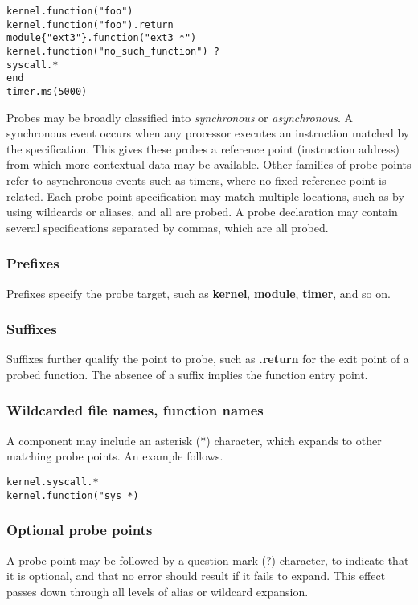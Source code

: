 \documentclass[twoside,english]{article}
\newenvironment{vindent}
{\begin{list}{}{\setlength{\listparindent}{6pt}}
\item[]}
{\end{list}}
\begin{document}
\begin{vindent}
\begin{verbatim}
kernel.function("foo")
kernel.function("foo").return
module{"ext3"}.function("ext3_*")
kernel.function("no_such_function") ?
syscall.*
end
timer.ms(5000)
\end{verbatim}
\end{vindent}

Probes may be broadly classified into \emph{synchronous}
or \emph{asynchronous}. A synchronous event occurs when
any processor executes an instruction matched by the specification. This
gives these probes a reference point (instruction address) from which more
contextual data may be available. Other families of probe points refer to
asynchronous events such as timers, where no fixed reference point is related.
Each probe point specification may match multiple locations, such as by using
wildcards or aliases, and all are probed. A probe declaration may contain
several specifications separated by commas, which are all probed.

\subsubsection{Prefixes}
Prefixes specify the probe target, such as \textbf{kernel}, \textbf{module},
\textbf{timer}, and so on.

\subsubsection{Suffixes}
Suffixes further qualify the point to probe, such as \textbf{.return} for the
exit point of a probed function. The absence of a suffix implies the function
entry point.

\subsubsection{Wildcarded file names, function names}
A component may include an asterisk ({*}) character, which expands to other
matching probe points. An example follows.

\begin{vindent}
\begin{verbatim}
kernel.syscall.*
kernel.function("sys_*)
\end{verbatim}
\end{vindent}

\subsubsection{Optional probe points\label{sub:Optional-probe-points}}
A probe point may be followed by a question mark (?) character, to indicate
that it is optional, and that no error should result if it fails to expand.
This effect passes down through all levels of alias or wildcard expansion.
\end{document}
